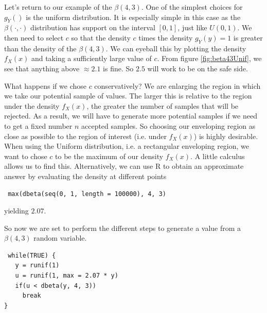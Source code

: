 \documentclass{article}
\begin{document}
Let's return to our example of the $\beta(4, 3)$.  One of the simplest
choices for $g_Y()$ is the uniform distribution.  It is especially
simple in this case as the $\beta(\cdot, \cdot)$ distribution has
support on the interval $[0, 1]$, just like $U(0, 1)$.  We then need
to select $c$ so that the density $c$ times the density $g_Y(y) = 1$
is greater than the density of the $\beta(4, 3)$.  We can eyeball this
by plotting the density $f_X(x)$ and taking a sufficiently large value
of $c$.  From figure \ref{fig:beta43Unif}, we see that anything above
$\approx 2.1$ is fine. So $2.5$ will work to be on the safe side.

What happens if we chose $c$ conservatively?  We are enlarging the
region in which we take our potential sample of values.  The larger
this is relative to the region under the density $f_X(x)$, the greater
the number of samples that will be rejected.  As a result, we will
have to generate more potential samples if we need to get a fixed
number $n$ accepted samples.  So choosing our enveloping region as
close as possible to the region of interest (i.e. under $f_X(x)$) is
highly desirable. When using the Uniform distribution, i.e. a
rectangular enveloping region, we want to chose $c$ to be the maximum
of our density $f_X(x)$.  A little calculus allows us to find this.
Alternatively, we can use R to obtain an approximate answer
by evaluating the density at different points 
\begin{verbatim}
 max(dbeta(seq(0, 1, length = 100000), 4, 3)
\end{verbatim}
yielding $2.07$.


So now we are set to perform the different steps to generate a value
from a $\beta(4, 3)$ random variable.
\begin{verbatim}
 while(TRUE) {
   y = runif(1)
   u = runif(1, max = 2.07 * y)
   if(u < dbeta(y, 4, 3))
     break
}
\end{verbatim}
\end{document}
